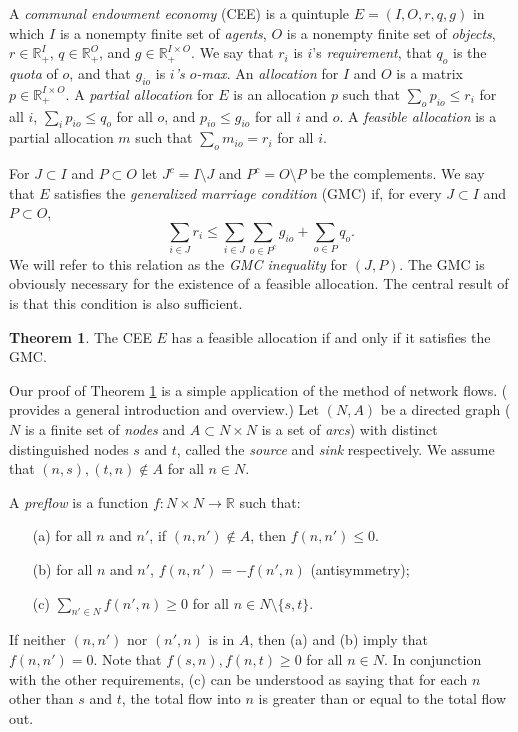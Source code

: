 \documentclass[12pt, A4paper]{article}
\theoremstyle{definition}
\newtheorem{thm}{Theorem}
\renewcommand{\Re}{\mathbb{R}}
\begin{document}
A \emph{communal endowment economy} (CEE) is a
quintuple $E = (I,O,r,q,g)$ in which $I$ is a nonempty finite set of \emph{agents}, $O$ is a nonempty finite set of \emph{objects}, $r \in \Re_+^I$, $q \in \Re_+^O$, and $g \in \Re_+^{I \times O}$.  We say that $r_i$ is
$i$'s \emph{requirement}, that $q_o$ is the \emph{quota} of $o$, and that $g_{io}$ is \emph{$i$'s $o$-max}.  
An \emph{allocation} for $I$ and $O$ is a
matrix $p \in \Re_+^{I \times O}$.  A \emph{partial allocation} for $E$ is an allocation $p$ such that $\sum_o p_{io} \le r_i$ for all $i$, $\sum_i p_{io} \le q_o$ for all $o$, and $p_{io} \le g_{io}$ for all $i$ and $o$. A \emph{feasible allocation} is a partial allocation $m$ such that $\sum_o m_{io} = r_i$ for all $i$. 

For $J \subset I$ and $P \subset O$ let $J^c = I \setminus J$ and $P^c = O \setminus P$ be the complements.  We say that $E$ satisfies the \emph{generalized marriage condition}
(GMC) if,  for every $J \subset I$ and $P \subset O$,
$$\sum_{i \in J} r_i \le \sum_{i \in J} \sum_{o \in P^c} g_{io} + \sum_{o \in P} q_o.$$  We will refer to this relation as the \emph{GMC inequality} for $(J,P)$.  The GMC is obviously necessary for the existence of a feasible allocation.  The central result of \cite{MTT23} is that this condition is also sufficient.

\begin{thm} \label{th:MultiHall}
  The CEE $E$ has a feasible allocation if and only if it satisfies the GMC.
\end{thm}

Our proof of Theorem \ref{th:MultiHall} is a simple application of the method of network flows.  (\cite{AhMaOr93} provides a general introduction and overview.)  Let $(N,A)$ be a directed graph ($N$ is a finite set of \emph{nodes} and $A \subset N \times N$ is a set of \emph{arcs}) with distinct distinguished nodes $s$ and $t$, called the \emph{source} and \emph{sink} respectively.  We assume that $(n,s), (t, n) \notin A$ for all $n \in N$.

A \emph{preflow} is a function $f \colon N \times N \to \Re$ such that:
\begin{enumerate}
  \item[(a)] for all $n$ and $n'$,  if $(n,n') \notin A$, then $f(n,n') \le 0$.
  \item[(b)] for all $n$ and $n'$,  $f(n,n') = - f(n',n)$ (antisymmetry); 
  \item[(c)] $\sum_{n' \in N} f(n',n) \ge 0$ for all $n \in N \setminus \{s,t\}$. 
\end{enumerate}
If neither $(n,n')$ nor $(n',n)$ is in $A$, then (a) and (b) imply that $f(n,n') = 0$.  Note that $f(s,n), f(n,t) \ge 0$ for all $n \in N$.
In conjunction with the other requirements, (c) can be understood as saying that for each $n$ other than $s$ and $t$, the total flow into $n$ is greater than or equal to the total flow out. 
\end{document}
